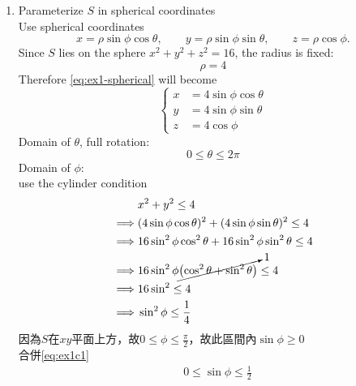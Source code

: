 ﻿\documentclass[12pt,a4paper]{article}
\begin{document}
\begin{problems}
\begin{enumerate}
  得到參數化方程:
  \begin{equation}
    \vec{\mathbf{r}}(r,\theta) = \left<
      r\cos\theta, r\sin\theta, \sqrt{16 - r^2}
    \right>
  \end{equation}
  With domain $0\leq r\leq2$ and $0\leq \theta \leq 2 \pi$.
  \item Parameterize $S$ in spherical coordinates\\
  Use spherical coordinates
  \begin{equation}
    x=\rho\sin\phi\cos\theta,
    \qquad
    y=\rho\sin\phi\sin\theta,
    \qquad
    z=\rho\cos\phi.
    \label{eq:ex1-spherical}
  \end{equation}
  Since $S$ lies on the sphere $x^2+y^2+z^2=16$, the radius is fixed:
  \begin{equation}
    \rho=4
  \end{equation}
  Therefore \eqref{eq:ex1-spherical} will become
  \begin{equation}
    \begin{cases}
      x &= 4 \sin\phi \cos\theta \\
      y &= 4\sin\phi \sin\theta\\
      z &= 4 \cos\phi
    \end{cases}
  \end{equation}
  Domain of $\theta$, full rotation:
  \begin{equation}
    0 \leq \theta \leq 2\pi
  \end{equation}
  Domain of $\phi$:\\
  use the cylinder condition
  \begin{align}
    &x^2 + y^2 \leq 4 \nonumber\\
    \implies& (4\sin\phi\cos\theta)^2+(4\sin\phi\sin\theta)^2\leq 4\nonumber\\
    \implies& 16\sin^2\phi\cos^2\theta+16\sin^2\phi\sin^2\theta \leq 4 \nonumber\\
    \implies& 16\sin^2\phi\cancelto{1}{\left(
      \cos^2\theta + \sin^2\theta
    \right)} \leq 4  \nonumber\\
    \implies& 16 \sin^2 \leq 4 \nonumber\\
    \implies& \sin^2\phi \leq \frac{1}{4} \label{eq:ex1c1}
  \end{align}
  因為$S$在$xy$平面上方，故$0\leq\phi\leq \frac{\pi}{2}$，故此區間內$\sin\phi\geq0$\\
  合併\eqref{eq:ex1c1}
  \begin{align}
    &0\leq \sin\phi \leq \frac{1}{2} \nonumber\\

\end{align}
\end{enumerate}
\end{problems}
\end{document}
